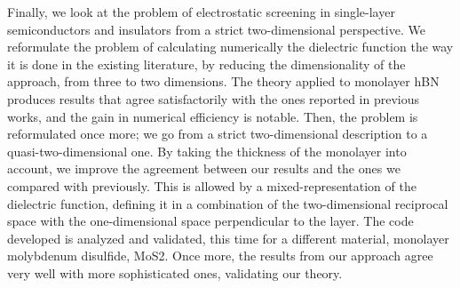 Finally, we look at the problem of electrostatic screening in single-layer semiconductors and insulators from a strict two-dimensional perspective.
We reformulate the problem of calculating numerically the dielectric function the way it is done in the existing literature, by reducing the dimensionality of the approach, from three to two dimensions.
The theory applied to monolayer hBN produces results that agree satisfactorily with the ones reported in previous works, and the gain in numerical efficiency is notable.
Then, the problem is reformulated once more; we go from a strict two-dimensional description to a quasi-two-dimensional one.
By taking the thickness of the monolayer into account, we improve the agreement between our results and the ones we compared with previously.
This is allowed by a mixed-representation of the dielectric function, defining it in a combination of the two-dimensional reciprocal space with the one-dimensional space perpendicular to the layer.
The code developed is analyzed and validated, this time for a different material, monolayer molybdenum disulfide, MoS2.
Once more, the results from our approach agree very well with more sophisticated ones, validating our theory.
